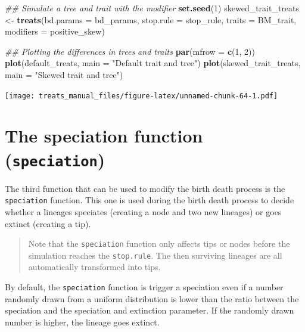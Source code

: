 \documentclass[
]{book}
\newenvironment{Shaded}{\begin{snugshade}}{\end{snugshade}}
\newcommand{\CommentTok}[1]{\textcolor[rgb]{0.56,0.35,0.01}{\textit{#1}}}
\newcommand{\DataTypeTok}[1]{\textcolor[rgb]{0.13,0.29,0.53}{#1}}
\newcommand{\DecValTok}[1]{\textcolor[rgb]{0.00,0.00,0.81}{#1}}
\newcommand{\KeywordTok}[1]{\textcolor[rgb]{0.13,0.29,0.53}{\textbf{#1}}}
\newcommand{\NormalTok}[1]{#1}
\newcommand{\StringTok}[1]{\textcolor[rgb]{0.31,0.60,0.02}{#1}}
\begin{document}
\begin{Shaded}
\begin{Highlighting}[]
\CommentTok{\#\# Simulate a tree and trait with the modifier}
\KeywordTok{set.seed}\NormalTok{(}\DecValTok{1}\NormalTok{)}
\NormalTok{skewed\_trait\_treats \textless{}{-}}\StringTok{ }\KeywordTok{treats}\NormalTok{(}\DataTypeTok{bd.params =}\NormalTok{ bd\_params,}
                          \DataTypeTok{stop.rule =}\NormalTok{ stop\_rule,}
                          \DataTypeTok{traits    =}\NormalTok{ BM\_trait,}
                          \DataTypeTok{modifiers =}\NormalTok{ positive\_skew)}

\CommentTok{\#\# Plotting the differences in trees and traits}
\KeywordTok{par}\NormalTok{(}\DataTypeTok{mfrow =} \KeywordTok{c}\NormalTok{(}\DecValTok{1}\NormalTok{, }\DecValTok{2}\NormalTok{))}
\KeywordTok{plot}\NormalTok{(default\_treats, }\DataTypeTok{main =} \StringTok{"Default trait and tree"}\NormalTok{)}
\KeywordTok{plot}\NormalTok{(skewed\_trait\_treats, }\DataTypeTok{main =} \StringTok{"Skewed trait and tree"}\NormalTok{)}
\end{Highlighting}
\end{Shaded}

\texttt{[image: treats\_manual\_files/figure-latex/unnamed-chunk-64-1.pdf]}

\hypertarget{the-speciation-function-speciation}{%
\section{\texorpdfstring{The speciation function (\texttt{speciation})}{The speciation function (speciation)}}\label{the-speciation-function-speciation}}

The third function that can be used to modify the birth death process is the \texttt{speciation} function.
This one is used during the birth death process to decide whether a lineages speciates (creating a node and two new lineages) or goes extinct (creating a tip).

\begin{quote}
Note that the \texttt{speciation} function only affects tips or nodes before the simulation reaches the \texttt{stop.rule}.
The then surviving lineages are all automatically transformed into tips.
\end{quote}

By default, the \texttt{speciation} function is trigger a speciation even if a number randomly drawn from a uniform distribution is lower than the ratio between the speciation and the speciation and extinction parameter. If the randomly drawn number is higher, the lineage goes extinct.
\end{document}
